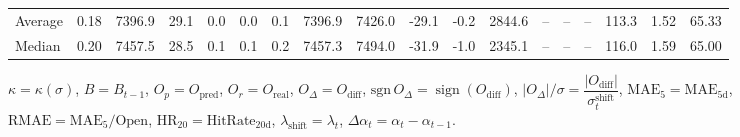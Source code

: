 \begin{threeparttable}
{\begin{tabular}{lrrrrrrrrrrrrrrrrr}
Average &     0.18 & 7396.9 &              29.1 &               0.0 &                0.0 &                0.1 & 7396.9 & 7426.0 &      -29.1 &                     -0.2 &              2844.6 &         -- &        -- &             -- &            113.3 &            1.52 &                  65.33 \\
 Median &     0.20 & 7457.5 &              28.5 &               0.1 &                0.1 &                0.2 & 7457.3 & 7494.0 &      -31.9 &                     -1.0 &              2345.1 &         -- &        -- &             -- &            116.0 &            1.59 &                  65.00 \\
\bottomrule
\end{tabular}
}
\begin{tablenotes}\footnotesize
\item $\kappa=\kappa(\sigma)$, $B=B_{t-1}$, $O_p=O_{\text{pred}}$, $O_r=O_{\text{real}}$, $O_\Delta=O_{\text{diff}}$, $\mathrm{sgn}\,O_\Delta=\operatorname{sign}(O_{\text{diff}})$, $|O_\Delta|/\sigma=\dfrac{|O_{\text{diff}}|}{\sigma_t^{\text{shift}}}$, $\mathrm{MAE}_5=\mathrm{MAE}_{5\text{d}}$, $\mathrm{RMAE}= \mathrm{MAE}_5 / \text{Open}$, $\mathrm{HR}_{20}=\mathrm{HitRate}_{20\text{d}}$, 
$\lambda_{\text{shift}}=\lambda_t$, 
$\Delta\alpha_t=\alpha_t-\alpha_{t-1}$.
\end{tablenotes}
\end{threeparttable}
\endgroup

